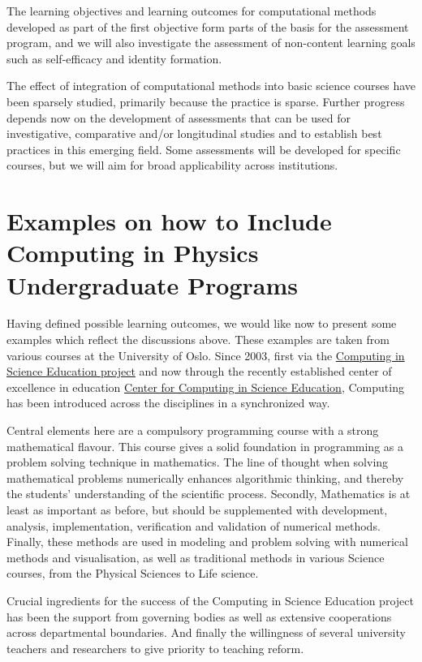 \documentclass[graybox,envcountchap,sectrefs]{svmult}
\begin{document}
The learning objectives and learning outcomes for computational
methods developed as part of the first objective form parts of the
basis for the assessment program, and we will also investigate the
assessment of non-content learning goals such as self-efficacy and
identity formation. 

The effect of integration of computational methods into basic science
courses have been sparsely studied, primarily because the practice is
sparse. Further progress depends now on the development of assessments
that can be used for investigative, comparative and/or longitudinal
studies and to establish best practices in this emerging field.  Some
assessments will be developed for specific courses, but we will aim
for broad applicability across institutions.

\section{Examples on how to Include Computing in Physics Undergraduate Programs}

Having defined possible learning outcomes, we would like now to present some examples which reflect the discussions above. These examples are taken from various courses at the University of Oslo. Since 2003, first via the \href{{http://www.mn.uio.no/ccse/english/people/index.html}}{Computing in Science Education project} and now through the recently established center of excellence in education \href{{http://www.mn.uio.no/ccse/english/}}{Center for Computing in Science Education}, Computing has been introduced across the disciplines in a synchronized way. 

Central elements here are a compulsory programming course with a strong mathematical flavour. This course gives a solid foundation in programming as a problem solving technique in mathematics. The line of thought when solving mathematical problems numerically enhances algorithmic thinking,  and thereby the students' understanding of the scientific process.
Secondly,  Mathematics is at least as important as before, but should be supplemented with development, analysis, implementation, verification and validation of numerical methods. Finally, these methods are used in modeling and problem solving with numerical methods and visualisation, as well as traditional methods in various Science courses, from the Physical Sciences to Life science.

Crucial ingredients for the success of the Computing in Science Education project has been 
the support from governing bodies as well as extensive  cooperations across departmental boundaries. And finally the willingness of several university teachers and researchers  to give priority to teaching reform. 
\end{document}
